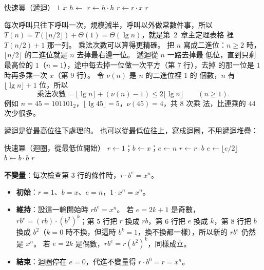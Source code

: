 \begin{pseudo}[label=alg:dc-power]{快速冪（遞迴）}
        \State \Return $1$
    \EndIf
        \State \Return $x$
    \EndIf
    \State $h \gets$ 
    \State $r \gets h \cdot h$
        \State $r \gets r \cdot x$
    \EndIf
    \State \Return $r$
\EndFunction
\end{pseudo}

每次呼叫只往下呼叫一次，規模減半，呼叫以外做常數件事，所以
$T(n) = T(\lfloor n/2 \rfloor) + \Theta(1) = \Theta(\lg n)$，就是第~2~章主定理表格
裡 $T(n/2) + 1$ 那一列。 乘法次數可以算得更精確。 把 $n$ 寫成二進位：$n \ge 2$
時，$\lfloor n/2 \rfloor$ 的二進位就是 $n$ 去掉最右邊一位。 遞迴從 $n$ 一路去掉最
低位，直到只剩最高位的 $1$（$n = 1$），途中每去掉一位做一次平方（第 7 行），去掉
的那一位是 $1$ 時再多乘一次 $x$（第 9 行）。 令 $\nu(n)$ 是 $n$ 的二進位裡 $1$ 的
個數，$n$ 有 $\lfloor \lg n \rfloor + 1$ 位，所以
\[
\text{乘法次數} = \lfloor \lg n \rfloor + (\nu(n) - 1) \le 2 \lfloor \lg n \rfloor
\qquad (n \ge 1).
\]
例如 $n = 45 = 101101_2$，$\lfloor \lg 45 \rfloor = 5$，$\nu(45) = 4$，共 $8$ 次乘
法，比連乘的 $44$ 次少很多。

遞迴是從最高位往下處理的。 也可以從最低位往上，寫成迴圈，不用遞迴堆疊：

\begin{pseudo}[label=alg:dc-power-iter]{快速冪（迴圈，從最低位開始）}
    \State $r \gets 1$；$b \gets x$；$e \gets n$
            \State $r \gets r \cdot b$
        \EndIf
        \State $e \gets \lfloor e/2 \rfloor$
            \State $b \gets b \cdot b$
        \EndIf
    \EndWhile
    \State \Return $r$
\EndFunction
\end{pseudo}

\textbf{不變量}：每次檢查第 3 行的條件時，$r \cdot b^e = x^n$。

\begin{itemize}
\item \textbf{初始}：$r = 1$、$b = x$、$e = n$，$1 \cdot x^n = x^n$。
\item \textbf{維持}：設這一輪開始時 $r b^e = x^n$。 若 $e = 2k + 1$ 是奇數，
$r b^e = (r b) \cdot (b^2)^k$；第 5 行把 $r$ 換成 $rb$，第 6 行把 $e$ 換成 $k$，第
8 行把 $b$ 換成 $b^2$（$k = 0$ 時不換，但這時 $b^k = 1$，換不換都一樣），所以新的
$r b^e$ 仍然是 $x^n$。 若 $e = 2k$ 是偶數，$r b^e = r (b^2)^k$，同樣成立。
\item \textbf{結束}：迴圈停在 $e = 0$，代進不變量得 $r \cdot b^0 = r = x^n$。
\end{itemize}

